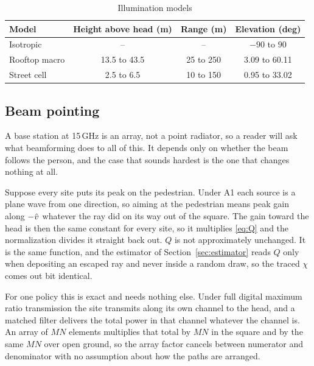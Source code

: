 \begin{table}[!t]
  \caption{Illumination models}
  \label{tab:models}
  \centering
  \begin{tabular}{lccc}
    \toprule
    Model & Height above head (m) & Range (m) & Elevation (deg) \\
    \midrule
    Isotropic & -- & -- & $-90$ to $90$ \\
    Rooftop macro & 13.5 to 43.5 & 25 to 250 & 3.09 to 60.11 \\
    Street cell & 2.5 to 6.5 & 10 to 150 & 0.95 to 33.02 \\
    \bottomrule
  \end{tabular}
\end{table}

\subsection{Beam pointing}

A base station at 15\,GHz is an array, not a point radiator, so a reader will
ask what beamforming does to all of this. It depends only on whether the beam
follows the person, and the case that sounds hardest is the one that changes
nothing at all.

Suppose every site puts its peak on the pedestrian. Under A1 each source is a
plane wave from one direction, so aiming at the pedestrian means peak gain along
$-\hat{v}$ whatever the ray did on its way out of the square. The gain toward the
head is then the same constant for every site, so it multiplies \eqref{eq:Q} and
the normalization divides it straight back out. $Q$ is not approximately
unchanged. It is the same function, and the estimator of
Section~\ref{sec:estimator} reads $Q$ only when depositing an escaped ray and
never inside a random draw, so the traced $\chi$ comes out bit identical.

For one policy this is exact and needs nothing else. Under full digital maximum
ratio transmission the site transmits along its own channel to the head, and a
matched filter delivers the total power in that channel whatever the channel is.
An array of $MN$ elements multiplies that total by $MN$ in the square and by the
same $MN$ over open ground, so the array factor cancels between numerator and
denominator with no assumption about how the paths are arranged.

